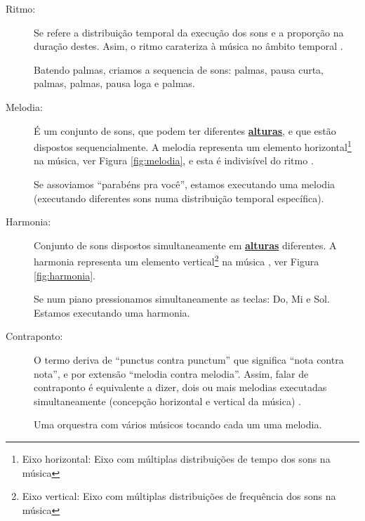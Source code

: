 \begin{description}
\item [Ritmo:] \label{sec:pos:Ritmo}
Se refere a distribuição temporal da execução dos sons e a proporção na duração destes. 
Asim, o ritmo carateriza à música no âmbito temporal \cite[pp. 11]{medteoria}.
\begin{example}
Batendo palmas, criamos a sequencia de sons: palmas, pausa curta, palmas, palmas, pausa loga e palmas.
\end{example} 
\item [Melodia:] \label{sec:pos:Melodia}
É um conjunto de sons, que podem ter diferentes \hyperref[sec:pos:Altura]{\textbf{alturas}}, 
e que estão dispostos sequencialmente. 
A melodia representa um elemento horizontal\footnote{\label{eixohor}Eixo horizontal: Eixo com múltiplas distribuições de tempo dos sons na música} na música, ver Figura \ref{fig:melodia},
e esta é indivisível do ritmo \cite[pp. 517]{apel1969harvard} \cite[pp. 11]{medteoria}.
\begin{example}
Se assoviamos ``parabéns pra você'', estamos executando uma melodia 
(executando diferentes sons numa distribuição temporal específica).
\end{example} 
\item [Harmonia:] \label{sec:pos:Harmonia}
Conjunto de sons dispostos simultaneamente em \hyperref[sec:pos:Altura]{\textbf{alturas}} diferentes.
A harmonia representa um elemento vertical\footnote{\label{eixover}Eixo vertical: Eixo com múltiplas distribuições de frequência dos sons na música} na música \cite[pp. 371]{apel1969harvard} \cite[pp. 8]{cardoso1973curso} \cite[pp. 11]{medteoria}, 
ver Figura \ref{fig:harmonia}. 
\begin{example}
Se num piano pressionamos simultaneamente as teclas: Do, Mi e Sol. Estamos executando uma harmonia.
\end{example} 
\item [Contraponto:] \label{sec:pos:Contraponto}
O termo deriva de ``punctus contra punctum'' que significa ``nota contra nota'', 
e por extensão ``melodia contra melodia''. 
Assim, falar de contraponto é equivalente a dizer, dois ou mais melodias executadas simultaneamente  
(concepção horizontal e vertical da música)  \cite[pp. 208]{apel1969harvard} \cite[pp. 11]{medteoria}.
\begin{example}
Uma orquestra com vários músicos tocando cada um uma melodia.
\end{example} 
\end{description}


